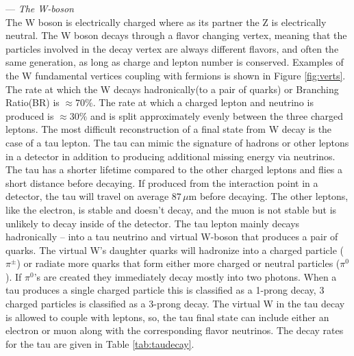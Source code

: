 --- \textit{The W-boson }\\
 The W boson is electrically charged where as its partner the Z is electrically neutral. The W boson decays through a flavor changing vertex, meaning that the particles involved in the decay vertex are always different flavors, and often the same generation, as long as charge and lepton number is conserved. Examples of the W fundamental vertices coupling with fermions is shown in Figure \ref{fig:verts}. The rate at which the W decays hadronically(to a pair of quarks) or Branching Ratio(BR) is $\approx 70\%$. The rate at which a charged lepton and neutrino is produced is $\approx30\%$ and is split approximately evenly between the three charged leptons. The most difficult reconstruction of a final state from W decay is the case of a tau lepton. The tau can mimic the signature of hadrons or other leptons in a detector in addition to producing additional missing energy via neutrinos. The tau has a shorter lifetime compared to the other charged leptons and flies a short distance before decaying. If produced from the interaction point in a detector, the tau will travel on average $87\,\mu\text{m}$ before decaying. The other leptons, like the electron, is stable and doesn't decay, and the muon is not stable but is unlikely to decay inside of the detector. The tau lepton mainly decays hadronically -- into a tau neutrino and virtual W-boson that produces a pair of quarks. The virtual W's daughter quarks will hadronize into a charged particle ($\pi^\pm$) or radiate more quarks that form either more charged or neutral particles ($\pi^0$). If $\pi^0$'s are created they immediately decay mostly into two photons. When a tau produces a single charged particle this is classified as a 1-prong decay, 3 charged particles is classified as a 3-prong decay. The virtual W in the tau decay is allowed to couple with leptons, so, the tau final state can include either an electron or muon along with the corresponding flavor neutrinos. The decay rates for the tau are given in Table \ref{tab:taudecay}.

